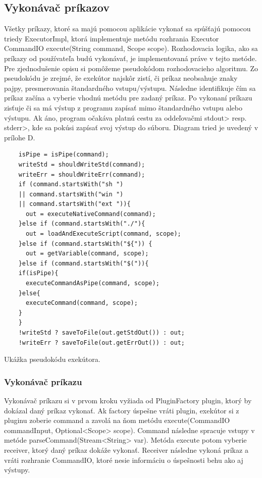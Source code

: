 \subsection{Vykonávač príkazov}
\indent Všetky príkazy, ktoré sa majú pomocou aplikácie vykonať sa spúšťajú pomocou triedy ExecutorImpl, ktorá implementuje metódu rozhrania Executor CommandIO execute(String command, Scope scope). Rozhodovacia logika, ako sa príkazy od používateľa budú vykonávať, je implementovaná práve v tejto metóde. Pre zjednodušenie opisu si pomôžeme pseudokódom rozhodovacieho algoritmu. Zo pseudokódu je zrejmé, že exekútor najskôr zistí, či príkaz neobsahuje znaky pajpy, presmerovania štandardného vstupu/výstupu. Následne identifikuje čím sa príkaz začína a vyberie vhodnú metódu pre zadaný príkaz. Po vykonaní príkazu zisťuje či sa má výstup z programu zapísať mimo štandardného vstupu alebo výstupu. Ak áno, program očakáva platnú cestu za oddeľovačmi stdout> \acrshort{resp.} stderr>, kde sa pokúsi zapísať svoj výstup do súboru. Diagram tried je uvedený v prílohe D.
\begin{algorithm}[H]
	\begin{verbatim}
	isPipe = isPipe(command);
	writeStd = shouldWriteStd(command);
	writeErr = shouldWriteErr(command);
	if (command.startsWith("sh ") 
	|| command.startsWith("win ") 
	|| command.startsWith("ext ")){
	  out = executeNativeCommand(command);
	}else if (command.startsWith("./"){
	  out = loadAndExecuteScript(command, scope);
	}else if (command.startsWith("${")) {
	  out = getVariable(command, scope);
	}else if (command.startsWith("$(")){
	if(isPipe){
	  executeCommandAsPipe(command, scope);
	}else{
	  executeCommand(command, scope);
	}
	}
	!writeStd ? saveToFile(out.getStdOut()) : out;
	!writeErr ? saveToFile(out.getErrOut()) : out;
	\end{verbatim}
	\caption{Ukážka pseudokódu exekútora. }
	\label{alg:gen}
\end{algorithm}
\newpage
\subsubsection{Vykonávač príkazu}
\indent Vykonávač príkazu si v prvom kroku vyžiada od PluginFactory plugin, ktorý by dokázal daný príkaz vykonať. Ak factory úspešne vráti plugin, exekútor si z pluginu zoberie command a zavolá na ňom metódu execute(CommandIO commandInput, Optional<Scope> scope{)}. Command následne spracuje vstupy v metóde \newline parseCommand{(}Stream<String> var). Metóda execute potom vyberie receiver, ktorý daný príkaz dokáže vykonať. Receiver následne vykoná príkaz a vráti rozhranie CommandIO, ktoré nesie informáciu o úspešnosti behu ako aj výstupy.

